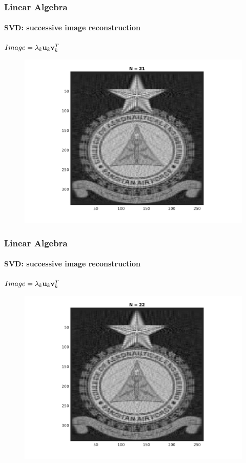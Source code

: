 \documentclass[hyperref={pdfpagelabels=true}]{beamer}
\begin{document}
\begin{frame}
\frametitle{Linear Algebra}
\framesubtitle{SVD: successive image reconstruction} 
\small{
\begin{center}
$Image = \lambda_k{\bf u}_k {\bf v}_k^T$
\end{center}}
\begin{figure}[!htb]
\centering
\includegraphics [scale=0.48]{n/b21.png}
\end{figure}
\end{frame}

\begin{frame}
\frametitle{Linear Algebra}
\framesubtitle{SVD: successive image reconstruction} 
\small{
\begin{center}
$Image = \lambda_k{\bf u}_k {\bf v}_k^T$
\end{center}}
\begin{figure}[!htb]
\centering
\includegraphics [scale=0.48]{n/b22.png}
\end{figure}
\end{frame}
\end{document}
